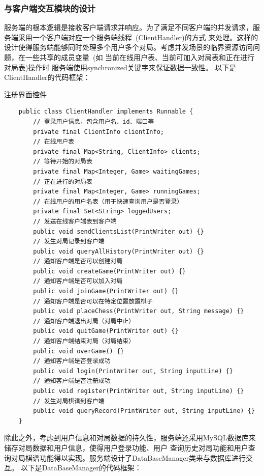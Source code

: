 \documentclass[utf8]{article}
\begin{document}
\subsubsection{与客户端交互模块的设计}
服务端的根本逻辑是接收客户端请求并响应。为了满足不同客户端的并发请求，服务端采用一个客户端对应一个服务端线程\ (ClientHandler)的方式
来处理。这样的设计使得服务端能够同时处理多个用户多个对局。考虑并发场景的临界资源访问问题，在一些共享的成员变量\ (如
当前在线用户表、当前可加入对局表和正在进行对局表)操作时
服务端使用synchronized关键字来保证数据一致性。
以下是ClientHandler的代码框架：
\begin{listing}[H]
    \caption{注册界面控件}
    \begin{verbatim}
    public class ClientHandler implements Runnable {
        // 登录用户信息，包含用户名、id、端口等
        private final ClientInfo clientInfo;
        // 在线用户表
        private final Map<String, ClientInfo> clients;
        // 等待开始的对局表
        private final Map<Integer, Game> waitingGames;
        // 正在进行的对局表
        private final Map<Integer, Game> runningGames;
        // 在线用户的用户名表（用于快速查询用户是否登录）
        private final Set<String> loggedUsers;
        // 发送在线客户端表到客户端
        public void sendClientsList(PrintWriter out) {}
        // 发生对局记录到客户端
        public void queryAllHistory(PrintWriter out) {}
        // 通知客户端是否可以创建对局
        public void createGame(PrintWriter out) {}
        // 通知客户端是否可以加入对局
        public void joinGame(PrintWriter out) {}
        // 通知客户端是否可以在特定位置放置棋子
        public void placeChess(PrintWriter out, String message) {}
        // 通知客户端退出对局（对局中止）
        public void quitGame(PrintWriter out) {}
        // 通知客户端结束对局（对局结束）
        public void overGame() {}
        // 通知客户端是否登录成功
        public void login(PrintWriter out, String inputLine) {}
        // 通知客户端是否注册成功
        public void register(PrintWriter out, String inputLine) {}
        // 发生对局棋谱到客户端
        public void queryRecord(PrintWriter out, String inputLine) {}
    }
    \end{verbatim}
\end{listing}
除此之外，考虑到用户信息和对局数据的持久性，服务端还采用MySQL数据库来储存对局数据和用户信息，使得用户登录功能、用户
查询历史对局功能和用户查询对局棋谱功能得以实现。服务端设计了DataBaseManager类来与数据库进行交互。
以下是DataBaseManager的代码框架：
\end{document}
